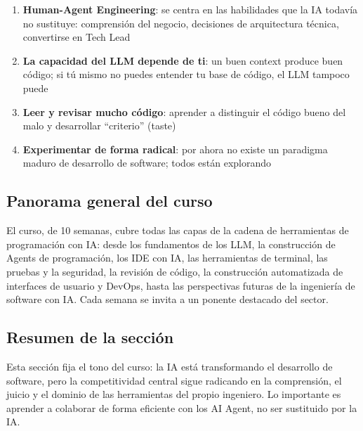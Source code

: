 \begin{enumerate}
    \item \textbf{Human-Agent Engineering}: se centra en las habilidades que la IA todavía no sustituye: comprensión del negocio, decisiones de arquitectura técnica, convertirse en Tech Lead
    \item \textbf{La capacidad del LLM depende de ti}: un buen context produce buen código; si tú mismo no puedes entender tu base de código, el LLM tampoco puede
    \item \textbf{Leer y revisar mucho código}: aprender a distinguir el código bueno del malo y desarrollar ``criterio'' (taste)
    \item \textbf{Experimentar de forma radical}: por ahora no existe un paradigma maduro de desarrollo de software; todos están explorando
\end{enumerate}

\subsection{Panorama general del curso}

El curso, de 10 semanas, cubre todas las capas de la cadena de herramientas de programación con IA: desde los fundamentos de los LLM, la construcción de Agents de programación, los IDE con IA, las herramientas de terminal, las pruebas y la seguridad, la revisión de código, la construcción automatizada de interfaces de usuario y DevOps, hasta las perspectivas futuras de la ingeniería de software con IA. Cada semana se invita a un ponente destacado del sector.

\subsection{Resumen de la sección}

Esta sección fija el tono del curso: la IA está transformando el desarrollo de software, pero la competitividad central sigue radicando en la comprensión, el juicio y el dominio de las herramientas del propio ingeniero. Lo importante es aprender a colaborar de forma eficiente con los AI Agent, no ser sustituido por la IA.
